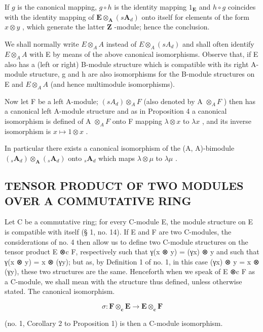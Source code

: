 If \(g\) is the canonical mapping, \(g \circ h\) is the identity mapping \(1_{\mathbf{E}}\) and \(h \circ g\) coincides with the identity mapping of \(\mathbf{E} \otimes_{\mathbf{A}} (s\mathbf{A}_d)\) onto itself for elements of the form \(x \otimes y\) , which generate the latter \(\mathbf{Z}\) -module; hence the conclusion.

We shall normally write \(E \otimes_{A} A\) instead of \(E \otimes_{A} (s A_{d})\) and shall often identify \(E \otimes_{A} A\) with E by means of the above canonical isomorphisms. Observe that, if E also has a (left or right) B-module structure which is compatible with its right A-module structure, g and h are also isomorphisms for the B-module structures on E and \(E \otimes_{A} A\) (and hence multimodule isomorphisms).

Now let F be a left A-module; \((sA_{d}) \otimes_{A} F\) (also denoted by A \(\otimes_{A} F\) ) then has a canonical left A-module structure and as in Proposition 4 a canonical isomorphism is defined of A \(\otimes_{A} F\) onto F mapping \(\lambda \otimes x\) to \(\lambda x\) , and its inverse isomorphism is \(x \mapsto 1 \otimes x\) .

In particular there exists a canonical isomorphism of the (A, A)-bimodule \((_{s}\mathbf{A}_{d})\otimes_{\mathbf{A}}(_{s}\mathbf{A}_{d})\) onto \({}_{s}\mathbf{A}_{d}\) which maps \(\lambda \otimes \mu\) to \(\lambda \mu\) .

\subsection{TENSOR PRODUCT OF TWO MODULES OVER A COMMUTATIVE RING}

Let C be a commutative ring; for every C-module E, the module structure on E is compatible with itself (§ 1, no. 14). If E and F are two C-modules, the considerations of no. 4 then allow us to define two C-module structures on the tensor product E ⊗c F, respectively such that γ(x ⊗ y) = (γx) ⊗ y and such that γ(x ⊗ y) = x ⊗ (γy); but as, by Definition 1 of no. 1, in this case (γx) ⊗ y = x ⊗ (γy), these two structures are the same. Henceforth when we speak of E ⊗c F as a C-module, we shall mean with the structure thus defined, unless otherwise stated. The canonical isomorphism.

\[
\sigma : \mathbf {F} \otimes_ {\mathbf {c}} \mathbf {E} \rightarrow \mathbf {E} \otimes_ {\mathbf {c}} \mathbf {F}
\]

(no. 1, Corollary 2 to Proposition 1) is then a C-module isomorphism.

